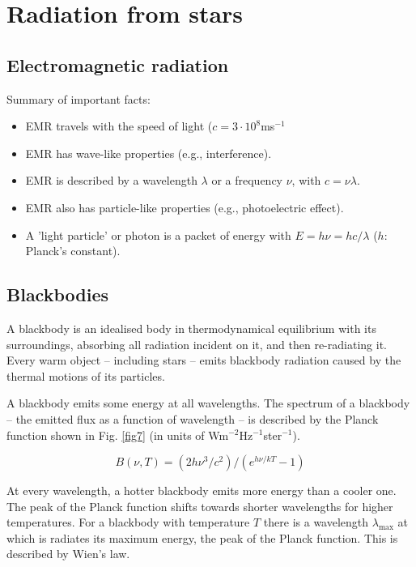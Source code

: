 \section{Radiation from stars}

\subsection{Electromagnetic radiation}

Summary of important facts:
\begin{itemize}
\item{EMR travels with the speed of light ($c = 3\cdot10^8$ms$^{-1}$}
\item{EMR has wave-like properties (e.g., interference).}
\item{EMR is described by a wavelength $\lambda$ or a frequency $\nu$,
with $c = \nu\lambda$.}
\item{EMR also has particle-like properties (e.g., photoelectric effect).}
\item{A 'light particle' or photon is a packet of energy with $E = h \nu = h c / \lambda$ ($h$: Planck's constant).}
\end{itemize}

\subsection{Blackbodies}

A blackbody is an idealised body in thermodynamical equilibrium with its surroundings, absorbing all radiation incident on it, and then re-radiating it. Every warm object -- including stars -- emits blackbody radiation caused by the thermal motions of its particles.

A blackbody emits some energy at all wavelengths. The spectrum of a blackbody -- the emitted flux as a function of wavelength -- is described by the Planck function shown in Fig. \ref{fig7} (in units of Wm$^{-2}$Hz$^{-1}$ster$^{-1}$).

\begin{equation}
B(\nu,T) = (2h\nu^3/c^2) / (e^{h\nu/kT} - 1)
\label{eq15}
\end{equation}

At every wavelength, a hotter blackbody emits more energy than a cooler one. The peak of the Planck function shifts towards shorter wavelengths for higher temperatures. For a blackbody with temperature $T$ there is a wavelength $\lambda_{\mathrm{max}}$ at which is radiates its maximum energy, the peak of the Planck function. This is described by Wien's law. 

